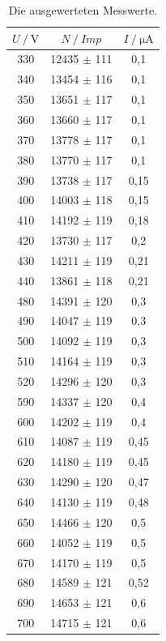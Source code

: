 \begin{table}
  \centering
  \caption{Die ausgewerteten Messwerte.}
  \begin{tabular}{ccc}
    \hline
    {$U  \mathbin{/} \unit{\volt}$} &
    {$N \mathbin{/} \mathbin{Imp}$} &
    {$I \mathbin{/} \unit{\micro\ampere}$} \\
    \hline
    330  &  12435  $\pm$ 111   &  0,1   \\
    340  &  13454  $\pm$ 116   &  0,1   \\
    350  &  13651  $\pm$ 117   &  0,1   \\
    360  &  13660  $\pm$ 117   &  0,1   \\
    370  &  13778  $\pm$ 117   &  0,1   \\
    380  &  13770  $\pm$ 117   &  0,1   \\
    390  &  13738  $\pm$ 117   &  0,15  \\
    400  &  14003  $\pm$ 118   &  0,15  \\
    410  &  14192  $\pm$ 119   &  0,18  \\
    420  &  13730  $\pm$ 117   &  0,2   \\
    430  &  14211  $\pm$ 119   &  0,21  \\
    440  &  13861  $\pm$ 118   &  0,21  \\
    480  &  14391  $\pm$ 120   &  0,3   \\
    490  &  14047  $\pm$ 119   &  0,3   \\
    500  &  14092  $\pm$ 119   &  0,3   \\
    510  &  14164  $\pm$ 119   &  0,3   \\
    520  &  14296  $\pm$ 120   &  0,3   \\
    590  &  14337  $\pm$ 120   &  0,4   \\
    600  &  14202  $\pm$ 119   &  0,4   \\
    610  &  14087  $\pm$ 119   &  0,45  \\
    620  &  14180  $\pm$ 119   &  0,45  \\
    630  &  14290  $\pm$ 120   &  0,47  \\
    640  &  14130  $\pm$ 119   &  0,48  \\
    650  &  14466  $\pm$ 120   &  0,5   \\
    660  &  14052  $\pm$ 119   &  0,5   \\
    670  &  14170  $\pm$ 119   &  0,5   \\
    680  &  14589  $\pm$ 121   &  0,52  \\
    690  &  14653  $\pm$ 121   &  0,6   \\
    700  &  14715  $\pm$ 121   &  0,6   \\
    \hline
  \end{tabular}
  \label{tab:charak}
\end{table}

